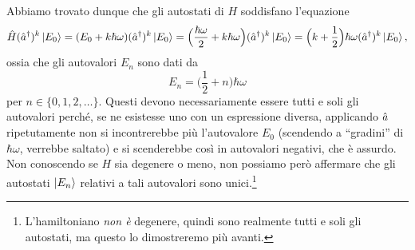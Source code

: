 Abbiamo trovato dunque che gli autostati di $H$ soddisfano l'equazione
\begin{equation}
	\hat{H}({\hat{a}}^\dagger)^k\left|{E_0}\right\rangle=(E_0+k\hbar\omega)({\hat{a}}^\dagger)^k\left|{E_0}\right\rangle=\Big(\frac{\hbar\omega}2+k\hbar\omega\Big)({\hat{a}}^\dagger)^k\left|{E_0}\right\rangle=\Big(k+\frac12\Big)\hbar\omega({\hat{a}}^\dagger)^k\left|{E_0}\right\rangle,
\end{equation}
ossia che gli autovalori $E_n$ sono dati da
\begin{equation}
	E_n=\Big(\frac12+n\Big)\hbar\omega
	\label{eq:oscillatore-armonico-autovalori-hamiltoniano}
\end{equation}
per $n\in\{0,1,2,\dots\}$.
Questi devono necessariamente essere tutti e soli gli autovalori perch\'e, se ne esistesse uno con un espressione diversa, applicando $\hat{a}$ ripetutamente non si incontrerebbe più l'autovalore $E_0$ (scendendo a ``gradini'' di $\hbar\omega$, verrebbe saltato) e si scenderebbe cos\`i in autovalori negativi, che è assurdo.
Non conoscendo se $H$ sia degenere o meno, non possiamo però affermare che gli autostati $\left|{E_n}\right\rangle$ relativi a tali autovalori sono unici.\footnote{L'hamiltoniano \emph{non è} degenere, quindi sono realmente tutti e soli gli autostati, ma questo lo dimostreremo più avanti.}

